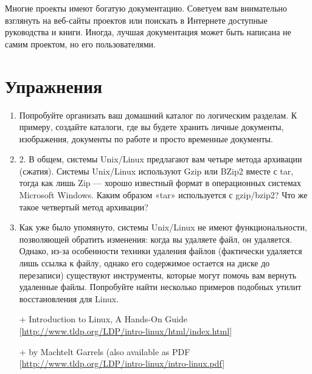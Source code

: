 \documentclass[10pt]{book}
\begin{document}
Многие проекты имеют богатую документацию. Советуем вам внимательно взглянуть на веб-сайты проектов или поискать в Интернете доступные руководства и книги. Иногда, лучшая документация может быть написана не самим проектом, но его пользователями.

\newpage
{\color{white}\section{Упражнения}}
\begin{tcolorbox}[title=\textbf{Упражнения}, colback=yellow!14!white, colframe=red!75!white]
\begin{enumerate}
	\item Попробуйте организать ваш домашний каталог по логическим разделам. К примеру, создайте каталоги, где вы будете хранить личные документы, изображения, документы по работе и просто временные документы. 
	\item 2. В общем, системы Unix/Linux предлагают вам четыре метода архивации (сжатия). Системы Unix/Linux используют Gzip или BZip2 вместе с tar, тогда как лишь Zip — хорошо известный формат в операционных системах Microsoft Windows. Каким образом «tar» используется с gzip/bzip2? Что же такое четвертый метод архивации?
	\item Как уже было упомянуто, системы Unix/Linux не имеют функциональности, позволяющей обратить изменения: когда вы удаляете файл, он удаляется. Однако, из-за особенности техники удаления файлов (фактически удаляется лишь ссылка к файлу, однако его содержимое остается на диске до перезаписи) существуют инструменты, которые могут помочь вам вернуть удаленные файлы. Попробуйте найти несколько примеров подобных утилит восстановления для Linux.
\end{enumerate}
\end{tcolorbox}

\phantom{}
\begin{tcolorbox}[title=\textbf{Дальнейшие ресурсы}, colback=yellow!14!white, colframe=red!75!blue]
\begin{itemize}
	\item[+] Introduction to Linux, A Hands-On Guide [\href{http://www.tldp.org/LDP/intro-linux/html/index.html}{http://www.tldp.org/LDP/intro-linux/html/index.html}]
	\item[+] by Machtelt Garrels (also available as PDF [\href{http://www.tldp.org/LDP/intro-linux/intro-linux.pdf}{http://www.tldp.org/LDP/intro-linux/intro-linux.pdf}]
\end{itemize}
\end{tcolorbox}
\end{document}
